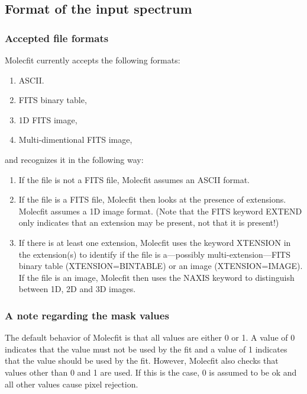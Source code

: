 \subsection{Format of the input spectrum}\label{sec:inputspec}
\subsubsection{Accepted file formats}\label{sec:inputspec_accepted}
Molecfit currently accepts the following formats:
\begin{enumerate}
    \item ASCII.
    \item FITS binary table,
    \item 1D FITS image,
    \item Multi-dimentional FITS image,
\end{enumerate}
and recognizes it in the following way:
\begin{enumerate}[i]
    \item If the file is not a FITS file, Molecfit assumes an ASCII format.
    \item If the file is a FITS file, Molecfit then looks at the presence of
          extensions.  Molecfit assumes a 1D image format.  (Note that the FITS
          keyword {\sc EXTEND} only indicates that an extension may be present,
          not that it is present!)
    \item If there is at least  one extension, Molecfit uses the keyword
          {\sc XTENSION} in the extension(s) to identify if the file is
          a---possibly multi-extension---FITS binary table
          ({\sc XTENSION=BINTABLE}) or an image ({\sc XTENSION=IMAGE}).  If the
          file is an image, Molecfit then uses the {\sc NAXIS} keyword to
          distinguish between 1D, 2D and 3D images.
\end{enumerate}

\subsubsection{A note regarding the mask values}\label{sec:inputspec_mask}
The default behavior of Molecfit is that all values are either 0 or 1. A value
of 0 indicates that the value must not be used by the fit and a value of 1
indicates that the value should be used by the fit. However, Molecfit also
checks that values other than 0 and 1 are used. If this is the case, 0 is
assumed to be ok and all other values cause pixel rejection.

